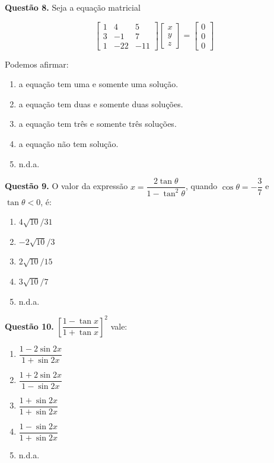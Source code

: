 \documentclass[11pt]{article}
\begin{document}
\textbf{Questão 8.} Seja a equação matricial

\[
\begin{bmatrix}
1 & 4 & 5 \\
3 &-1 & 7 \\
1 &-22&-11
\end{bmatrix}
\begin{bmatrix}
x \\
y \\
z
\end{bmatrix}
=
\begin{bmatrix}
0\\
0\\
0
\end{bmatrix}
\]

Podemos afirmar:

\begin{enumerate}[\bf A (\quad)]
    \item a equação tem uma e somente uma solução. 
    \item a equação tem duas e somente duas soluções. 
    \item a equação tem três e somente três soluções.
    \item a equação não tem solução.
    \item n.d.a.
\end{enumerate}

\textbf{Questão 9.} O    valor    da    expressão   $x = \dfrac{2 \tan \theta}{1 - \tan^2 \theta}$,    quando    $\cos \theta = -\dfrac{3}{7}$ e $\tan \theta < 0$, é:  

\begin{multicols}{3}
    \begin{enumerate}[\bf A (\quad)]
        \item $4\sqrt{10}/31$
        \item $-2\sqrt{10}/3$
        \item $2\sqrt{10}/15$
        \item $3\sqrt{10}/7$
        \item n.d.a.
    \end{enumerate}
\end{multicols}

\textbf{Questão 10.} $\left[ \dfrac{1 - \tan x}{1 + \tan x} \right]^2$ vale:

\begin{multicols}{3}
    \begin{enumerate}[\bf A (\quad)]
        \item $\dfrac{1 - 2\sin 2x}{1 + \sin 2x}$
        \item $\dfrac{1 + 2\sin 2x}{1 - \sin 2x}$
        \item $\dfrac{1 + \sin 2x}{1 + \sin 2x}$
        \item $\dfrac{1 - \sin 2x}{1 + \sin 2x}$
        \item n.d.a.
    \end{enumerate}
\end{multicols}
\end{document}
